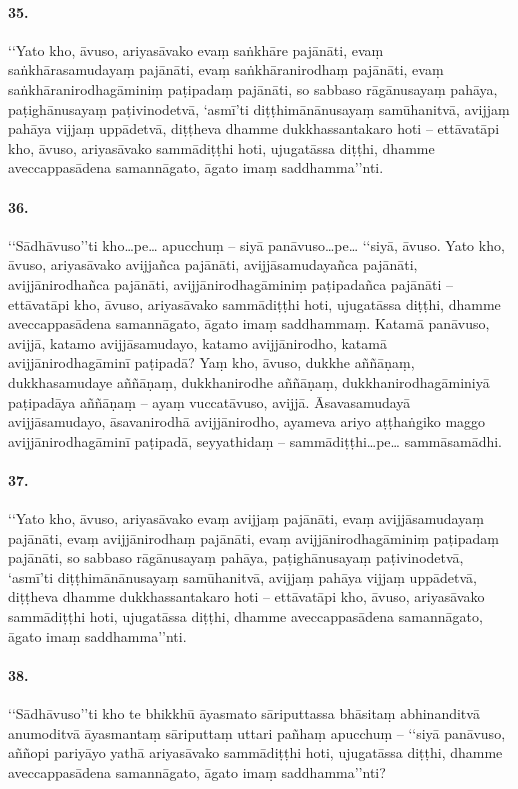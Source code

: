 \paragraph{35.} ‘‘Yato kho, āvuso, ariyasāvako evaṃ saṅkhāre pajānāti, evaṃ saṅkhārasamudayaṃ pajānāti, evaṃ saṅkhāranirodhaṃ pajānāti, evaṃ saṅkhāranirodhagāminiṃ paṭipadaṃ pajānāti, so sabbaso rāgānusayaṃ pahāya, paṭighānusayaṃ paṭivinodetvā, ‘asmī’ti diṭṭhimānānusayaṃ samūhanitvā, avijjaṃ pahāya vijjaṃ uppādetvā, diṭṭheva dhamme dukkhassantakaro hoti – ettāvatāpi kho, āvuso, ariyasāvako sammādiṭṭhi hoti, ujugatāssa diṭṭhi, dhamme aveccappasādena samannāgato, āgato imaṃ saddhamma’’nti.

\paragraph{36.} ‘‘Sādhāvuso’’ti kho…pe… apucchuṃ – siyā panāvuso…pe… ‘‘siyā, āvuso. Yato kho, āvuso, ariyasāvako avijjañca pajānāti, avijjāsamudayañca pajānāti, avijjānirodhañca pajānāti, avijjānirodhagāminiṃ paṭipadañca pajānāti – ettāvatāpi kho, āvuso, ariyasāvako sammādiṭṭhi hoti, ujugatāssa diṭṭhi, dhamme aveccappasādena samannāgato, āgato imaṃ saddhammaṃ. Katamā panāvuso, avijjā, katamo avijjāsamudayo, katamo avijjānirodho, katamā avijjānirodhagāminī paṭipadā? Yaṃ kho, āvuso, dukkhe aññāṇaṃ, dukkhasamudaye aññāṇaṃ, dukkhanirodhe aññāṇaṃ, dukkhanirodhagāminiyā paṭipadāya aññāṇaṃ – ayaṃ vuccatāvuso, avijjā. Āsavasamudayā avijjāsamudayo, āsavanirodhā avijjānirodho, ayameva ariyo aṭṭhaṅgiko maggo avijjānirodhagāminī paṭipadā, seyyathidaṃ – sammādiṭṭhi…pe… sammāsamādhi.

\paragraph{37.} ‘‘Yato kho, āvuso, ariyasāvako evaṃ avijjaṃ pajānāti, evaṃ avijjāsamudayaṃ pajānāti, evaṃ avijjānirodhaṃ pajānāti, evaṃ avijjānirodhagāminiṃ paṭipadaṃ pajānāti, so sabbaso rāgānusayaṃ pahāya, paṭighānusayaṃ paṭivinodetvā, ‘asmī’ti diṭṭhimānānusayaṃ samūhanitvā, avijjaṃ pahāya vijjaṃ uppādetvā, diṭṭheva dhamme dukkhassantakaro hoti – ettāvatāpi kho, āvuso, ariyasāvako sammādiṭṭhi hoti, ujugatāssa diṭṭhi, dhamme aveccappasādena samannāgato, āgato imaṃ saddhamma’’nti.

\paragraph{38.} ‘‘Sādhāvuso’’ti kho te bhikkhū āyasmato sāriputtassa bhāsitaṃ abhinanditvā anumoditvā āyasmantaṃ sāriputtaṃ uttari pañhaṃ apucchuṃ – ‘‘siyā panāvuso, aññopi pariyāyo yathā ariyasāvako sammādiṭṭhi hoti, ujugatāssa diṭṭhi, dhamme aveccappasādena samannāgato, āgato imaṃ saddhamma’’nti?

